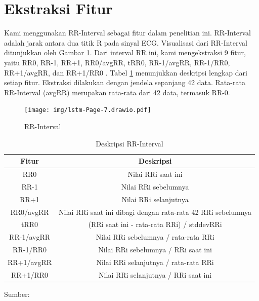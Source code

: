 \section{Ekstraksi Fitur}
\label{subsec: bab4-ekstraksi-fitur}

Kami menggunakan RR-Interval sebagai fitur dalam penelitian ini.
RR-Interval adalah jarak antara dua titik R pada sinyal ECG.
Visualisasi dari RR-Interval ditunjukkan oleh Gambar \ref{fig:rri}.
Dari interval RR ini, kami mengekstraksi 9 fitur, yaitu RR0, RR-1, RR+1, RR0/avgRR, tRR0, RR-1/avgRR, RR-1/RR0, RR+1/avgRR, dan RR+1/RR0 \parencite{pramukantoroHeartbeatClassifierContinuous2022}.
Tabel \ref{tab:rri} menunjukkan deskripsi lengkap dari setiap fitur.
Ekstraksi dilakukan dengan jendela sepanjang 42 data. Rata-rata RR-Interval (avgRR) merupakan rata-rata dari 42 data, termasuk RR-0. 

\begin{figure}[H]
  \centering
  \texttt{[image: img/lstm-Page-7.drawio.pdf]}
  \caption{RR-Interval}
  \label{fig:rri}
\end{figure}

\begin{table}[H]
  \caption{Deskripsi RR-Interval}
\begin{center}
\footnotesize
\begin{tabular}{c @{\hspace{1cm}} c}
\hline
Fitur & Deskripsi\\
\hline
RR0 & Nilai RRi saat ini\\
RR-1 & Nilai RRi sebelumnya\\
RR+1  & Nilai RRi selanjutnya\\
RR0/avgRR & Nilai RRi saat ini dibagi dengan rata-rata 42 RRi sebelumnya\\
tRR0  & (RRi saat ini - rata-rata RRi) / stddevRRi\\
RR-1/avgRR & Nilai RRi sebelumnya / rata-rata RRi\\
RR-1/RR0 & Nilai RRi sebelumnya / RRi saat ini\\
RR+1/avgRR & Nilai RRi selanjutnya / rata-rata RRi\\
RR+1/RR0 & Nilai RRi selanjutnya / RRi saat ini\\
\hline
\end{tabular}
\end{center}
\center
Sumber: \textcite{pramukantoroHeartbeatClassifierContinuous2022}
\label{tab:rri}
\end{table}


